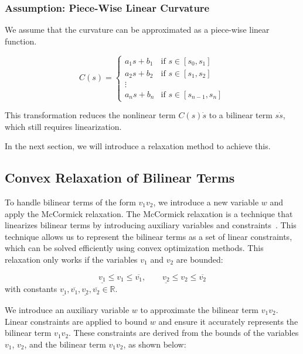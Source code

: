\subsubsection{Assumption: Piece-Wise Linear Curvature}

We assume that the curvature can be approximated as a piece-wise linear function.

\[
	C(s) = \begin{cases}
		a_1s+b_1 & \text{if } s \in [s_0, s_1]     \\
		a_2s+b_2 & \text{if } s \in [s_1, s_2]     \\
		\vdots                                     \\
		a_ns+b_n & \text{if } s \in [s_{n-1}, s_n]
	\end{cases}
\]

This transformation reduces the nonlinear term $C(s)\dot{s}$ to a bilinear term $s\dot{s}$, which still requires linearization.

In the next section, we will introduce a relaxation method to achieve this.

\subsection{Convex Relaxation of Bilinear Terms} \label{subsec:convex_relaxation_for_bilinear_terms}

To handle bilinear terms of the form $v_1v_2$, we introduce a new variable $w$ and apply the McCormick relaxation.
The McCormick relaxation is a technique that linearizes bilinear terms by introducing auxiliary variables and
constraints~\cite{mccormick_computability_1976}.
This technique allows us to represent the bilinear terms as a set of linear constraints, which can be solved efficiently using convex optimization
methods.
This relaxation only works if the variables $v_1$ and $v_2$ are bounded:

\[ \underline{v_1} \leq v_1 \leq \overline{v_1}, \qquad
	\underline{v_2} \leq v_2 \leq \overline{v_2} \] with constants $\underline{v_1}, \overline{v_1}, \underline{v_2}, \overline{v_2} \in \mathbb{R}$.

We introduce an auxiliary variable $w$ to approximate the bilinear term $v_1v_2$.
Linear constraints are applied to bound $w$ and ensure it accurately represents the bilinear term $v_1v_2$.
These constraints are derived from the bounds of the variables $v_1$, $v_2$, and the bilinear term $v_1v_2$, as shown below:

